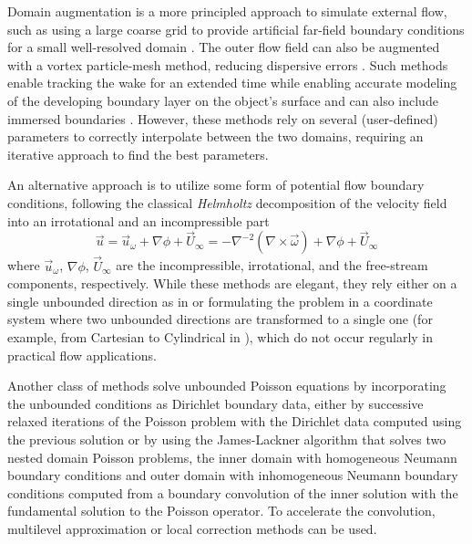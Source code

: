 \documentclass[final,1p,times]{elsarticle}
\begin{document}
Domain augmentation is a more principled approach to simulate external flow, such as using a large coarse grid to provide artificial far-field boundary conditions for a small well-resolved domain \cite{Colonius2008}. The outer flow field can also be augmented with a vortex particle-mesh method, reducing dispersive errors \cite{Billuart2023AFlows}. Such methods enable tracking the wake for an extended time while enabling accurate modeling of the developing boundary layer on the object's surface and can also include immersed boundaries \cite{Marichal2015UnboundedMethods}. However, these methods rely on several (user-defined) parameters to correctly interpolate between the two domains, requiring an iterative approach to find the best parameters.

An alternative approach is to utilize some form of potential flow boundary conditions, following the classical \emph{Helmholtz} decomposition of the velocity field into an irrotational and an incompressible part
\begin{equation}\label{eq:u_vort}
    \vec{u} = \vec{u}_\omega + \nabla\phi + \vec{U}_\infty = -\nabla^{-2}\left(\nabla \times \vec{\omega}\right) + \nabla\phi + \vec{U}_\infty
\end{equation}
where $\vec{u}_\omega$, $\nabla\phi$, $\vec{U}_\infty$ are the incompressible, irrotational, and the free-stream components, respectively. While these methods are elegant, they rely either on a single unbounded direction as in \cite{Grosch1977NumericalTransforms} or formulating the problem in a coordinate system where two unbounded directions are transformed to a single one (for example, from Cartesian to Cylindrical in \cite{Levy2022SolvingMethod}), which do not occur regularly in practical flow applications.

Another class of methods solve unbounded Poisson equations by incorporating the unbounded conditions as Dirichlet boundary data, either by successive relaxed iterations of the Poisson problem with the Dirichlet data computed using the previous solution \cite{Miller2008AnBoundaries} or by using the James-Lackner \cite{Jamb1977TheDistributions, Lackner1976COMPUTATIONEQUILIBRIA} algorithm that solves two nested domain Poisson problems, the inner domain with homogeneous Neumann boundary conditions and outer domain with inhomogeneous Neumann boundary conditions computed from a boundary convolution of the inner solution with the fundamental solution to the Poisson operator. To accelerate the convolution, multilevel approximation \cite{Mccorquodale2006ADimensions} or local correction methods \cite{Kavouklis2019ComputationCorrections} can be used.
\end{document}
